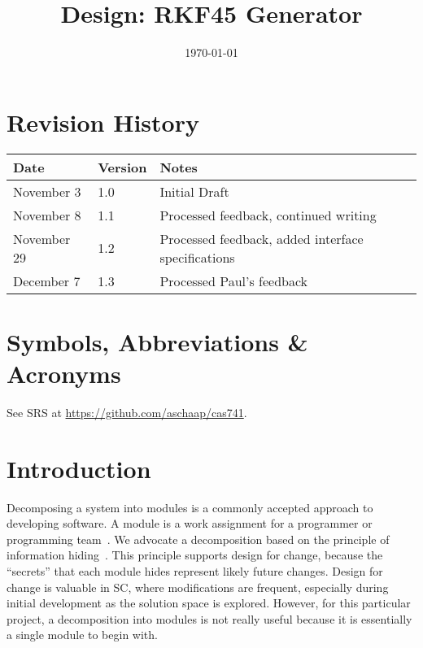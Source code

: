 \documentclass[12pt, titlepage]{article}
\begin{document}
\title{Design: RKF45 Generator} 
\date{\today}

\maketitle


\section{Revision History}

\begin{tabularx}{\textwidth}{p{3cm}p{2cm}X}
\toprule {\bf Date} & {\bf Version} & {\bf Notes}\\
\midrule
November 3 & 1.0 & Initial Draft\\
November 8 & 1.1 & Processed feedback, continued writing\\
November 29 & 1.2 & Processed feedback, added interface specifications\\
December 7 & 1.3 & Processed Paul's feedback\\
\bottomrule
\end{tabularx}

\newpage

\section{Symbols, Abbreviations \& Acronyms}
See SRS at \url{https://github.com/aschaap/cas741}.

\newpage

\tableofcontents

%

\newpage


\section{Introduction}


Decomposing a system into modules is a commonly accepted approach to developing
software.  A module is a work assignment for a programmer or programming
team~\citep{ParnasEtAl1984}.  We advocate a decomposition
based on the principle of information hiding~\citep{Parnas1972a}.  This
principle supports design for change, because the ``secrets'' that each module
hides represent likely future changes.  Design for change is valuable in SC,
where modifications are frequent, especially during initial development as the
solution space is explored. However, for this particular project, a 
decomposition into modules is not really useful because it is essentially a 
single module to begin with.
\end{document}
